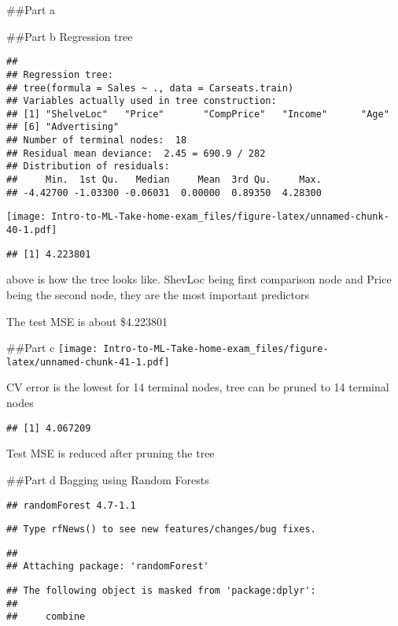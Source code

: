 \documentclass[
]{article}
\begin{document}
\#\#Part a

\#\#Part b Regression tree

\begin{verbatim}
## 
## Regression tree:
## tree(formula = Sales ~ ., data = Carseats.train)
## Variables actually used in tree construction:
## [1] "ShelveLoc"   "Price"       "CompPrice"   "Income"      "Age"        
## [6] "Advertising"
## Number of terminal nodes:  18 
## Residual mean deviance:  2.45 = 690.9 / 282 
## Distribution of residuals:
##     Min.  1st Qu.   Median     Mean  3rd Qu.     Max. 
## -4.42700 -1.03300 -0.06031  0.00000  0.89350  4.28300
\end{verbatim}

\texttt{[image: Intro-to-ML-Take-home-exam\_files/figure-latex/unnamed-chunk-40-1.pdf]}

\begin{verbatim}
## [1] 4.223801
\end{verbatim}

above is how the tree looks like. ShevLoc being first comparison node
and Price being the second node, they are the most important predictors

The test MSE is about \$4.223801

\#\#Part c
\texttt{[image: Intro-to-ML-Take-home-exam\_files/figure-latex/unnamed-chunk-41-1.pdf]}

CV error is the lowest for 14 terminal nodes, tree can be pruned to 14
terminal nodes

\begin{verbatim}
## [1] 4.067209
\end{verbatim}

Test MSE is reduced after pruning the tree

\#\#Part d Bagging using Random Forests

\begin{verbatim}
## randomForest 4.7-1.1
\end{verbatim}

\begin{verbatim}
## Type rfNews() to see new features/changes/bug fixes.
\end{verbatim}

\begin{verbatim}
## 
## Attaching package: 'randomForest'
\end{verbatim}

\begin{verbatim}
## The following object is masked from 'package:dplyr':
## 
##     combine
\end{verbatim}
\end{document}
